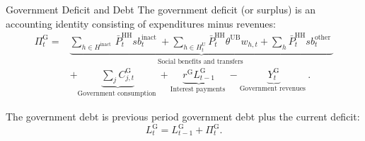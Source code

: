 \documentclass[9pt]{beamer}
\begin{document}
\begin{frame}{Government Deficit and Debt}
The government deficit (or surplus) is an accounting identity consisting of expenditures minus revenues:
\begin{equation}
\begin{aligned}
\scriptscriptstyle \Pi^{\mathrm{G}}_t= & \underbrace{\sum_{h \in H^{\text {inact }}} \bar{P}^{\mathrm{HH}}_t s b^{\text {inact }}_t+\sum_{h \in H^{\mathrm{U}}_t} \bar{P}^{\mathrm{HH}}_t \theta^{\mathrm{UB}} w_{h,t}+\sum_h \bar{P}^{\mathrm{HH}}_t s b_t^{\text {other }}}_{\text {Social benefits and transfers }} \\
& +\underbrace{\sum_j C^{\mathrm{G}}_{j,t}}_{\text {Government consumption }}+\underbrace{r^{\mathrm{G}} L_{t-1}^{\mathrm{G}}}_{\text {Interest payments }}-\underbrace{Y_t^{\mathrm{G}}}_{\text {Government revenues }} .
\end{aligned}
\end{equation}

The government debt is previous period government debt plus the current deficit:
\begin{equation}
    L^{\mathrm{G}}_t=L^{\mathrm{G}}_{t-1}+\Pi^{\mathrm{G}}_t.
\end{equation}
    \hyperlink{ReturnOverview}{}
\end{frame}
\end{document}

